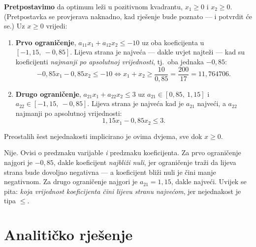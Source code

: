 \begin{korak}
\textbf{Pretpostavimo} da optimum leži u pozitivnom kvadrantu, $x_1 \geq 0$ i
$x_2 \geq 0$. (Pretpostavka se provjerava naknadno, kad rješenje bude poznato ---
i potvrdit će se.) Uz $x \geq 0$ vrijedi:
\begin{enumerate}[leftmargin=*]
  \item \textbf{Prvo ograničenje}, $a_{11}x_1 + a_{12}x_2 \leq -10$ uz oba
        koeficijenta u $[-1{,}15,\ -0{,}85]$. Lijeva strana je najveća --- dakle
        uvjet najteži --- kad su koeficijenti \emph{najmanji po apsolutnoj
        vrijednosti}, tj.\ oba jednaka $-0{,}85$:
        \begin{equation}
          -0{,}85 x_1 - 0{,}85 x_2 \leq -10
          \iff x_1 + x_2 \geq \frac{10}{0{,}85} = \frac{200}{17} = 11{,}764706 .
          \label{eq:z2-wc1}
        \end{equation}
  \item \textbf{Drugo ograničenje}, $a_{21}x_1 + a_{22}x_2 \leq 3$ uz
        $a_{21} \in [0{,}85,\ 1{,}15]$ i $a_{22} \in [-1{,}15,\ -0{,}85]$. Lijeva
        strana je najveća kad je $a_{21}$ najveći, a $a_{22}$ najmanji po
        apsolutnoj vrijednosti:
        \begin{equation}
          1{,}15 x_1 - 0{,}85 x_2 \leq 3 .
          \label{eq:z2-wc2}
        \end{equation}
\end{enumerate}
Preostalih šest nejednakosti implicirano je ovima dvjema, sve dok $x \geq 0$.
\end{korak}

\begin{zamka}
Nije. Ovisi o predznaku varijable \emph{i} predznaku koeficijenta. Za prvo
ograničenje najgori je $-0{,}85$, dakle koeficijent \emph{najbliži nuli}, jer
ograničenje traži da lijeva strana bude dovoljno negativna --- a koeficijent
bliži nuli je čini manje negativnom. Za drugo ograničenje najgori je
$a_{21} = 1{,}15$, dakle najveći. Uvijek se pita: \emph{koja vrijednost
koeficijenta čini lijevu stranu najvećom}, jer nejednakost je tipa $\leq$.
\end{zamka}

\section{Analitičko rješenje}
\label{sec:z2-analiticki}

